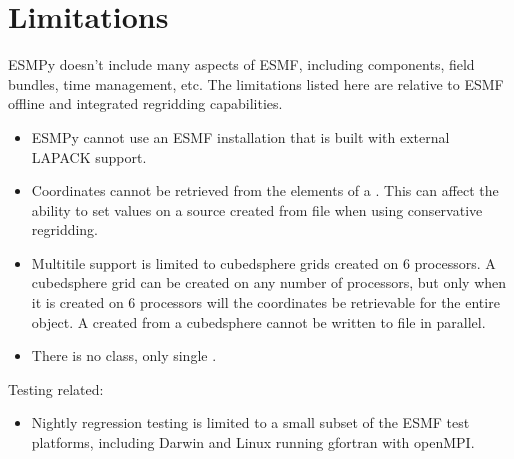 \documentclass[letterpaper,10pt,english]{sphinxmanual}
\begin{document}
\section{Limitations}
\label{\detokenize{install:limitations}}
ESMPy doesn’t include many aspects of ESMF, including components, field bundles,
time management, etc.  The limitations listed here are relative
to ESMF offline and integrated regridding capabilities.
\begin{itemize}
\item {} 
ESMPy cannot use an ESMF installation that is built with external LAPACK
support.

\item {} 
Coordinates cannot be retrieved from the elements of a
{\hyperref[\detokenize{mesh:ESMF.api.mesh.Mesh}]{}}. This can affect the ability to set
{\hyperref[\detokenize{field:ESMF.api.field.Field}]{}} values on a source {\hyperref[\detokenize{mesh:ESMF.api.mesh.Mesh}]{}}
created from file when using conservative regridding.

\item {} 
Multi\sphinxhyphen{}tile {\hyperref[\detokenize{grid:ESMF.api.grid.Grid}]{}} support is limited to cubed\sphinxhyphen{}sphere
grids created on 6 processors. A cubed\sphinxhyphen{}sphere grid can be created on any
number of processors, but only when it is created on 6 processors will the
coordinates be retrievable for the entire object. A
{\hyperref[\detokenize{field:ESMF.api.field.Field}]{}} created from a cubed\sphinxhyphen{}sphere
{\hyperref[\detokenize{grid:ESMF.api.grid.Grid}]{}} cannot be written to file in parallel.

\item {} 
There is no  class, only single {\hyperref[\detokenize{field:ESMF.api.field.Field}]{}}.

\end{itemize}

Testing related:
\begin{itemize}
\item {} 
Nightly regression testing is limited to a small subset of the ESMF test platforms,
including Darwin and Linux running gfortran with openMPI.

\end{itemize}
\end{document}
